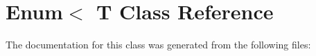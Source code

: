 \hypertarget{class_enum_3_01_t}{}\section{Enum$<$ T Class Reference}
\label{class_enum_3_01_t}


The documentation for this class was generated from the following files\+: